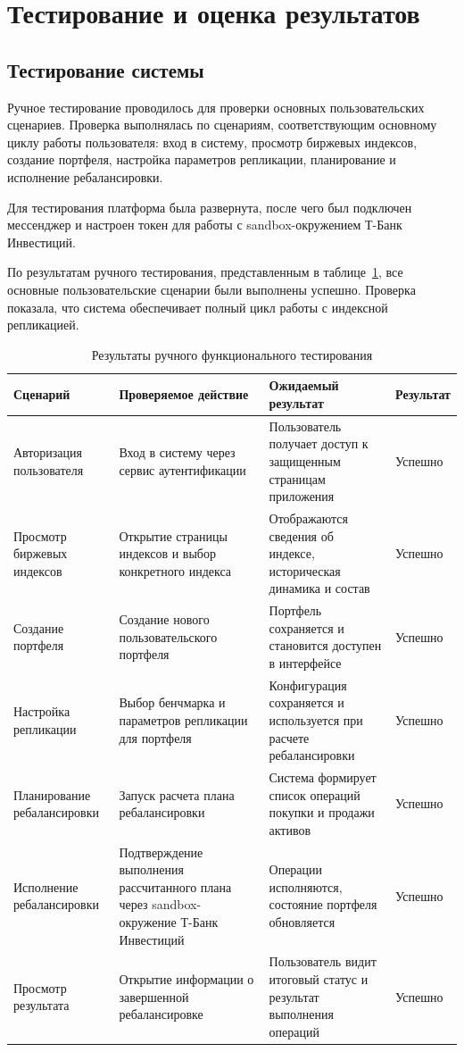 \documentclass[14pt]{gost-7-32}
\begin{document}
\newpage
\section{Тестирование и оценка результатов}

\subsection{Тестирование системы}

Ручное тестирование проводилось для проверки основных пользовательских сценариев. Проверка выполнялась по сценариям, соответствующим основному циклу работы пользователя: вход в систему, просмотр биржевых индексов, создание портфеля, настройка параметров репликации, планирование и исполнение ребалансировки.

Для тестирования платформа была развернута, после чего был подключен мессенджер и настроен токен для работы с sandbox-окружением Т-Банк Инвестиций.

По результатам ручного тестирования, представленным в таблице~\ref{tab:manual-functional-testing}, все основные пользовательские сценарии были выполнены успешно. Проверка показала, что система обеспечивает полный цикл работы с индексной репликацией.

\begin{table}[h]
\small
\setlength{\tabcolsep}{4pt}
\begin{tabularx}{\textwidth}{|p{}|X|X|p{}|}
\hline
\textbf{Сценарий} & \textbf{Проверяемое действие} & \textbf{Ожидаемый результат} & \textbf{Результат} \\
\hline
Авторизация пользователя & Вход в систему через сервис аутентификации & Пользователь получает доступ к защищенным страницам приложения & Успешно \\
\hline
Просмотр биржевых индексов & Открытие страницы индексов и выбор конкретного индекса & Отображаются сведения об индексе, историческая динамика и состав & Успешно \\
\hline
Создание портфеля & Создание нового пользовательского портфеля & Портфель сохраняется и становится доступен в интерфейсе & Успешно \\
\hline
Настройка репликации & Выбор бенчмарка и параметров репликации для портфеля & Конфигурация сохраняется и используется при расчете ребалансировки & Успешно \\
\hline
Планирование ребалансировки & Запуск расчета плана ребалансировки & Система формирует список операций покупки и продажи активов & Успешно \\
\hline
Исполнение ребалансировки & Подтверждение выполнения рассчитанного плана через sandbox-окружение Т-Банк Инвестиций & Операции исполняются, состояние портфеля обновляется & Успешно \\
\hline
Просмотр результата & Открытие информации о завершенной ребалансировке & Пользователь видит итоговый статус и результат выполнения операций & Успешно \\
\hline
\end{tabularx}
\caption{Результаты ручного функционального тестирования}
\label{tab:manual-functional-testing}
\end{table}
\end{document}

